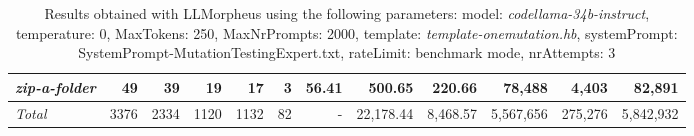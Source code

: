 \begin{table*}
{\begin{tabular}{l||r|r|r|r|r|r||r|r||r|r|r}
   \hline
   \textit{zip-a-folder} & 49 & 39 & 19 & 17 & 3 & 56.41 & 500.65 & 220.66 & 78,488 & 4,403 & 82,891 \\ 
   \hline
   \textit{Total} & 3376 & 2334 & 1120 & 1132 & 82 & - & 22,178.44  & 8,468.57 & 5,567,656 & 275,276 & 5,842,932 \\ 
 \end{tabular}
 }
 \caption{Results obtained with LLMorpheus using the following parameters: 
   model: \textit{codellama-34b-instruct}, 
   temperature: 0, 
   MaxTokens: 250, 
   MaxNrPrompts: 2000, 
   template: \textit{template-onemutation.hb}, 
   systemPrompt: SystemPrompt-MutationTestingExpert.txt, 
   rateLimit: benchmark mode, 
   nrAttempts: 3  
 }
\end{table*}

